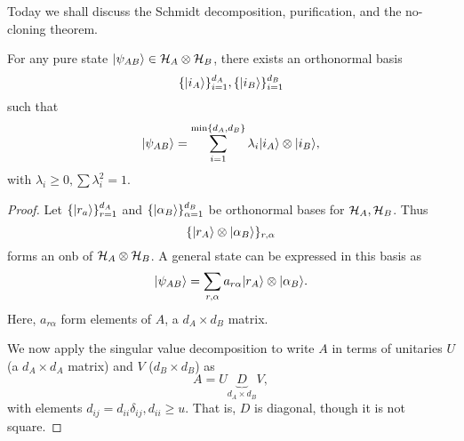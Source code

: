 Today we shall discuss the Schmidt decomposition, purification, and the no-cloning theorem.

\begin{thm}
    For any pure state $\lvert\psi_{AB}\rangle\in \mathcal H_A \otimes \mathcal H_B$, there exists an orthonormal basis
    \begin{equation}
        \{\lvert i_A\rangle\}_{i=1}^{d_A},\{\lvert i_B\rangle\}_{i=1}^{d_B}
    \end{equation}
    such that
    \begin{equation}
        \lvert\psi_{AB}\rangle=\sum_{i=1}^{\min\{d_A,d_B\}}\lambda_i \lvert i_A\rangle\otimes \lvert i_B\rangle,
    \end{equation}
    with $\lambda_i \geq 0, \sum \lambda_i^2 = 1$.
\end{thm}
\begin{proof}
    Let $\{\lvert r_a\rangle\}_{r=1}^{d_A}$ and $\{\lvert\alpha_B\rangle\}_{\alpha=1}^{d_B}$ be orthonormal bases for $\mathcal H_A,\mathcal H_B$. Thus
    \begin{equation}
        \{\lvert r_A\rangle\otimes \lvert\alpha_B\rangle\}_{r,\alpha}
    \end{equation}
    forms an onb of $\mathcal H_A \otimes \mathcal H_B$. A general state can be expressed in this basis as
    \begin{equation}
        \lvert\psi_{AB}\rangle=\sum_{r,\alpha} a_{r\alpha} \lvert r_A\rangle \otimes \lvert\alpha_B\rangle.
    \end{equation}
    Here, $a_{r\alpha}$ form elements of $A$, a $d_A\times d_B$ matrix.
    
    We now apply the singular value decomposition to write $A$ in terms of unitaries $U$ (a $d_A \times d_A$ matrix) and $V$ ($d_B\times d_B$) as
    \begin{equation}
        A=U\underbrace{D}_{d_A\times d_B} V,
    \end{equation}
    with elements $d_{ij}=d_{ii}\delta_{ij},d_{ii}\geq u$. That is, $D$ is diagonal, though it is not square.
    

\end{proof}

